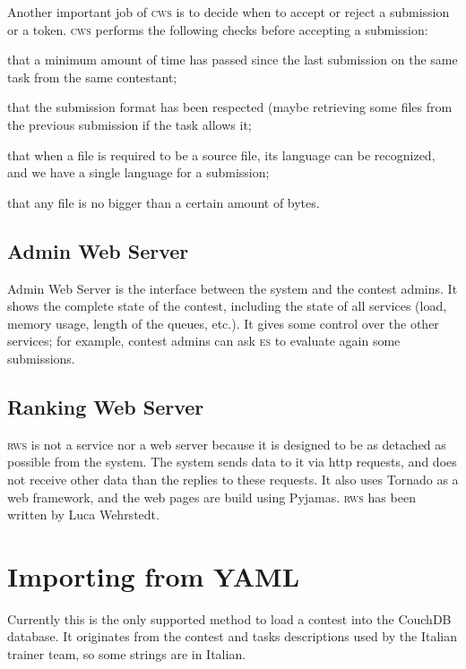 \documentclass[a4paper,8pt]{amsart}
\newcommand{\ES}{\textsc{es}}
\newcommand{\CWS}{\textsc{cws}}
\newcommand{\RWS}{\textsc{rws}}
\newenvironment{squishlist}{%
  \begin{list}{\textbullet}%
    { \setlength{\itemsep}{0pt}%
      \setlength{\parsep}{3pt}%
      \setlength{\topsep}{3pt}%
      \setlength{\partopsep}{0pt}%
      \setlength{\leftmargin}{1.5em}%
      \setlength{\labelwidth}{1em}%
      \setlength{\labelsep}{0.5em} }%
}{\end{list}}
\begin{document}
\begin{multicols}{2}
  Another important job of \CWS{} is to decide when to accept or
  reject a submission or a token. \CWS{} performs the following checks
  before accepting a submission:
  \begin{squishlist}
  \item that a minimum amount of time has passed since the last
    submission on the same task from the same contestant;
  \item that the submission format has been respected (maybe
    retrieving some files from the previous submission if the task
    allows it;
  \item that when a file is required to be a source file, its language
    can be recognized, and we have a single language for a submission;
  \item that any file is no bigger than a certain amount of bytes.
  \end{squishlist}

  \subsection{Admin Web Server}

  Admin Web Server is the interface between the system and the
  contest admins. It shows the complete state of the contest,
  including the state of all services (load, memory usage, length of
  the queues, etc.). It gives some control over the other services;
  for example, contest admins can ask \ES{} to evaluate again some
  submissions.

  \subsection{Ranking Web Server}

  \RWS{} is not a service nor a web server because it is designed to
  be as detached as possible from the system. The system sends data to
  it via http requests, and does not receive other data than the
  replies to these requests. It also uses Tornado as a web framework,
  and the web pages are build using Pyjamas. \RWS{} has been written
  by Luca Wehrstedt.

  \section{Importing from YAML}

  Currently this is the only supported method to load a contest into
  the CouchDB database. It originates from the contest and tasks
  descriptions used by the Italian trainer team, so some strings are
  in Italian.


\end{multicols}
\end{document}
